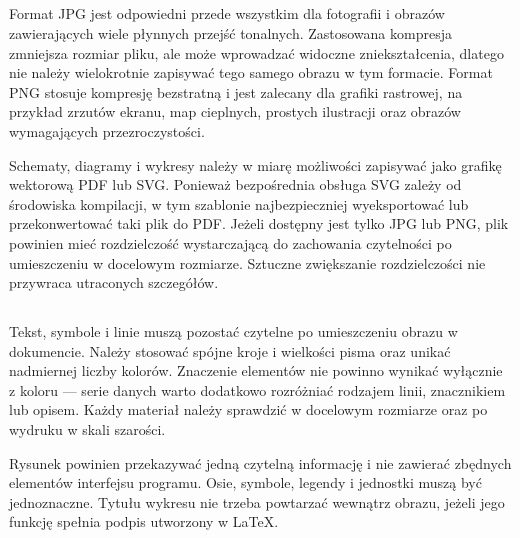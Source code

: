 \subsection{}

Format JPG jest odpowiedni przede wszystkim dla fotografii i obrazów zawierających wiele płynnych przejść tonalnych. Zastosowana kompresja zmniejsza rozmiar pliku, ale może wprowadzać widoczne zniekształcenia, dlatego nie należy wielokrotnie zapisywać tego samego obrazu w tym formacie. Format PNG stosuje kompresję bezstratną i jest zalecany dla grafiki rastrowej, na przykład zrzutów ekranu, map cieplnych, prostych ilustracji oraz obrazów wymagających przezroczystości.

Schematy, diagramy i wykresy należy w miarę możliwości zapisywać jako grafikę wektorową PDF lub SVG. Ponieważ bezpośrednia obsługa SVG zależy od środowiska kompilacji, w tym szablonie najbezpieczniej wyeksportować lub przekonwertować taki plik do PDF. Jeżeli dostępny jest tylko JPG lub PNG, plik powinien mieć rozdzielczość wystarczającą do zachowania czytelności po umieszczeniu w docelowym rozmiarze. Sztuczne zwiększanie rozdzielczości nie przywraca utraconych szczegółów.

\subsection{}

Tekst, symbole i linie muszą pozostać czytelne po umieszczeniu obrazu w dokumencie. Należy stosować spójne kroje i wielkości pisma oraz unikać nadmiernej liczby kolorów. Znaczenie elementów nie powinno wynikać wyłącznie z koloru — serie danych warto dodatkowo rozróżniać rodzajem linii, znacznikiem lub opisem. Każdy materiał należy sprawdzić w docelowym rozmiarze oraz po wydruku w skali szarości.

Rysunek powinien przekazywać jedną czytelną informację i nie zawierać zbędnych elementów interfejsu programu. Osie, symbole, legendy i jednostki muszą być jednoznaczne. Tytułu wykresu nie trzeba powtarzać wewnątrz obrazu, jeżeli jego funkcję spełnia podpis utworzony w LaTeX.

\subsection{}

